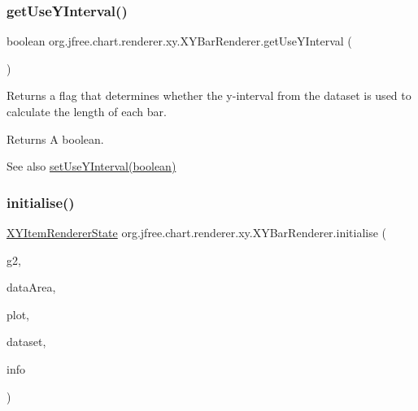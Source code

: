 \subsubsection{\texorpdfstring{get\+Use\+Y\+Interval()}{getUseYInterval()}}
{\footnotesize\ttfamily boolean org.\+jfree.\+chart.\+renderer.\+xy.\+X\+Y\+Bar\+Renderer.\+get\+Use\+Y\+Interval (\begin{DoxyParamCaption}{ }\end{DoxyParamCaption})}

Returns a flag that determines whether the y-\/interval from the dataset is used to calculate the length of each bar.

\begin{DoxyReturn}{Returns}
A boolean.
\end{DoxyReturn}
\begin{DoxySeeAlso}{See also}
\mbox{\hyperlink{classorg_1_1jfree_1_1chart_1_1renderer_1_1xy_1_1_x_y_bar_renderer_af327f26a4813ff9cd15872b48a184042}{set\+Use\+Y\+Interval(boolean)}} 
\end{DoxySeeAlso}
\mbox{\label{classorg_1_1jfree_1_1chart_1_1renderer_1_1xy_1_1_x_y_bar_renderer_a67f97116714f551bfac4ff00170bfca8}} 
\subsubsection{\texorpdfstring{initialise()}{initialise()}}
{\footnotesize\ttfamily \mbox{\hyperlink{classorg_1_1jfree_1_1chart_1_1renderer_1_1xy_1_1_x_y_item_renderer_state}{X\+Y\+Item\+Renderer\+State}} org.\+jfree.\+chart.\+renderer.\+xy.\+X\+Y\+Bar\+Renderer.\+initialise (\begin{DoxyParamCaption}\item[{Graphics2D}]{g2,  }\item[{Rectangle2D}]{data\+Area,  }\item[{\mbox{\hyperlink{classorg_1_1jfree_1_1chart_1_1plot_1_1_x_y_plot}{X\+Y\+Plot}}}]{plot,  }\item[{\mbox{\hyperlink{interfaceorg_1_1jfree_1_1data_1_1xy_1_1_x_y_dataset}{X\+Y\+Dataset}}}]{dataset,  }\item[{\mbox{\hyperlink{classorg_1_1jfree_1_1chart_1_1plot_1_1_plot_rendering_info}{Plot\+Rendering\+Info}}}]{info }\end{DoxyParamCaption})}

